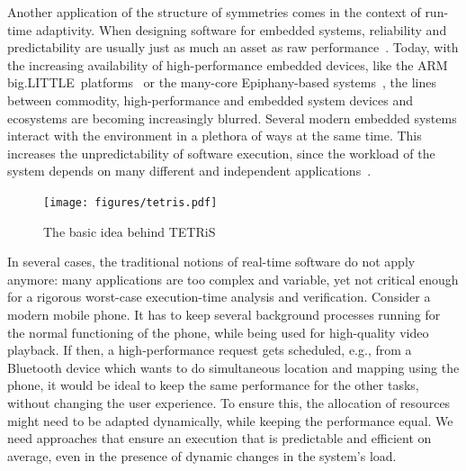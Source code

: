 \documentclass[sigplan,10pt]{acmart}
\begin{document}
Another application of the structure of symmetries comes in the context of run-time adaptivity.
When designing software for embedded systems, reliability and predictability are usually just as much an asset as raw performance~\cite{edwards2007case,axer2014building,lee2008cyber}.
Today, with the increasing availability of high-performance embedded devices, like the ARM big.LITTLE\texttrademark~platforms~\cite{biglittlewhitepaper} or the many-core Epiphany-based systems~\cite{olofsson2016epiphany}, the lines between commodity, high-performance and embedded system devices and ecosystems are becoming increasingly blurred.
Several modern embedded systems interact with the environment in a plethora of ways at the same time.
This increases the unpredictability of software execution, since the workload of the system depends on many different and independent applications~\cite{lee2008cyber}.

\begin{figure}[t]
	\centering
	\texttt{[image: figures/tetris.pdf]}
	\caption{The basic idea behind TETRiS}
	\label{fig:tetris_idea}
\end{figure}

In several cases, the traditional notions of real-time software do not apply anymore: many applications are too complex and variable, yet not critical enough for a rigorous worst-case execution-time analysis and verification.
Consider a modern mobile phone.
It has to keep several background processes running for the normal functioning of the phone, while being used for high-quality video playback.
If then, a high-performance request gets scheduled, e.g., from a Bluetooth device which wants to do simultaneous location and mapping using the phone, it would be ideal to keep the same performance for the other tasks, without changing the user experience.
To ensure this, the allocation of resources might need to be adapted dynamically, while keeping the performance equal.
We need approaches that ensure an execution that is predictable and efficient on average, even in the presence of dynamic changes in the system's load.
\end{document}
